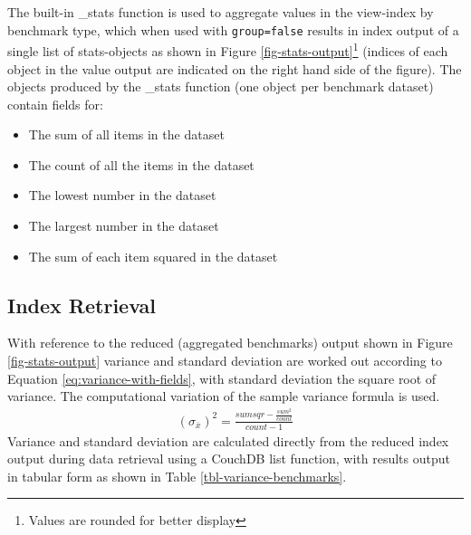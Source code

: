 The built-in \_stats function is used to aggregate values in the view-index by benchmark type, which when used with \texttt{group=false} results in index output of a single list of stats-objects as shown in Figure \ref{fig-stats-output}\footnote{Values are rounded for better display} (indices of each object in the value output are indicated on the right hand side of the figure). The objects produced by the \_stats function (one object per benchmark dataset) contain fields for:

\begin{itemize}
    \item The sum of all items in the dataset
    \item The count of all the items in the dataset
    \item The lowest number in the dataset
    \item The largest number in the dataset
    \item The sum of each item squared in the dataset
\end{itemize}



\subsection{Index Retrieval}
With reference to the reduced (aggregated benchmarks) output shown in Figure \ref{fig-stats-output} variance and standard deviation are worked out according to Equation \ref{eq:variance-with-fields}, with standard deviation the square root of variance. The computational variation of the sample variance formula is used.
\begin{align}
    (\sigma_{\overline{x}})^{2} =  \frac{sumsqr - \frac{sum^2}{count}}{count - 1}\label{eq:variance-with-fields}
\end{align}
Variance and standard deviation are calculated directly from the reduced index output during data retrieval using a CouchDB list function, with results output in tabular form as shown in Table \ref{tbl-variance-benchmarks}.

